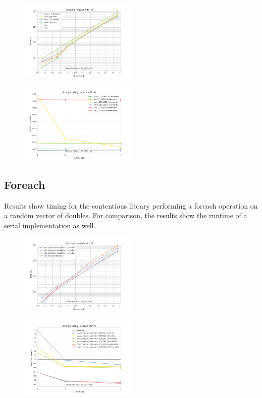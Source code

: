 \documentclass[pageno]{jpaper}
\begin{document}
\begin{figure}[!h]
\centering
    \includegraphics[width=0.5\textwidth]{graphs/cont-reduce_sz-vs-time.png}
\end{figure}
\begin{figure}[!h]
\centering
    \includegraphics[width=0.5\textwidth]{graphs/cont-reduce-large_procs-vs-speedup.png}
\end{figure}

\subsection{Foreach}
Results show timing for the contentious library performing a foreach operation
on a random vector of doubles. For comparison, the results show the runtime of a
serial implementation as well.

\begin{figure}[!h]
\centering
    \includegraphics[width=0.5\textwidth]{graphs/cont-foreach_sz-vs-time.png}
\end{figure}
\begin{figure}[!h]
\centering
    \includegraphics[width=0.5\textwidth]{graphs/cont-foreach_procs-vs-speedup.png}
\end{figure}
\end{document}
